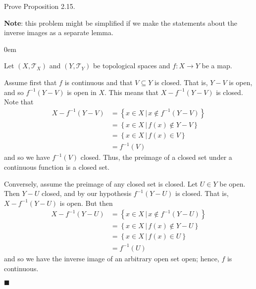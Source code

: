 \documentclass[12pt]{article}
\renewcommand{\qed}{\hfill$\blacksquare$}
\renewenvironment{proof}{\begin{addmargin}[1em]{0em}\begin{newproof}}{\end{newproof}\end{addmargin}\qed}
\newenvironment{exercise}[2][Exercise]{\begin{trivlist}
\item[\hskip \labelsep {\bfseries #1}\hskip \labelsep {\bfseries #2.}]}{\end{trivlist}}
\begin{document}
\begin{exercise}{2.16}
Prove Proposition 2.15.
\end{exercise}
\textbf{Note}: this problem might be simplified if we make the statements about the inverse images as a separate lemma.\\
\begin{proof}
Let $\left(X,\mathcal{T}_X\right)$ and $\left(Y,\mathcal{T}_Y\right)$ be topological spaces and $f:X\rightarrow Y$ be a map.

Assume first that $f$ is continuous and that $V\subseteq Y$ is closed. That is, $Y-V$ is open, and so $f^{-1}\left(Y-V\right)$ is open in $X$. This means that $X-f^{-1}\left(Y-V\right)$ is closed. Note that
\begin{equation*}
	\begin{split}
		X-f^{-1}\left(Y-V\right) & = \left\{ x\in X \, | \, x \notin f^{-1}\left(Y-V\right) \right\} \\
		& = \left\{ x\in X \, | \, f\left(x\right) \notin Y-V \right\} \\
		& = \left\{ x\in X \, | \, f\left(x\right) \in V \right\} \\
		& = f^{-1}\left(V\right)
	\end{split}
\end{equation*}
and so we have $f^{-1}\left(V\right)$ closed. Thus, the preimage of a closed set under a continuous function is a closed set.

Conversely, assume the preimage of any closed set is closed. Let $U \in Y$ be open. Then $Y-U$ closed, and by our hypothesis $f^{-1}\left(Y-U\right)$ is closed. That is, $X-f^{-1}\left(Y-U\right)$ is open. But then
\begin{equation*}
	\begin{split}
		X-f^{-1}\left(Y-U\right) & = \left\{ x\in X \, | \, x\notin f^{-1}\left(Y-U\right) \right\} \\
		& = \left\{ x\in X \, | \, f\left(x\right) \notin Y-U \right\} \\
		& = \left\{ x\in X \, | \, f\left(x\right) \in U \right\} \\
		& = f^{-1}\left(U\right)
	\end{split}
\end{equation*}
and so we have the inverse image of an arbitrary open set open; hence, $f$ is continuous.
\end{proof}
\end{document}
